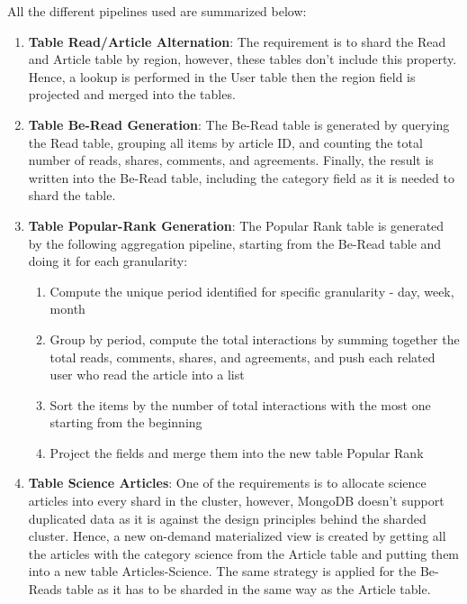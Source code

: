 \documentclass{report}
\begin{document}
    All the different pipelines used are summarized below:
    \begin{enumerate}
        \item \textbf{Table Read/Article Alternation}: The requirement is to shard the Read and Article table by region, however, these tables don't include this property. Hence, a lookup is performed in the User table then the region field is projected and merged into the tables.
        \item \textbf{Table Be-Read Generation}: The Be-Read table is generated by querying the Read table, grouping all items by article ID, and counting the total number of reads, shares, comments, and agreements. Finally, the result is written into the Be-Read table, including the category field as it is needed to shard the table.
        \item \textbf{Table Popular-Rank Generation}: The Popular Rank table is generated by the following aggregation pipeline, starting from the Be-Read table and doing it for each granularity:
         \begin{enumerate}
            \item Compute the unique period identified for specific granularity - day, week, month
            \item Group by period, compute the total interactions by summing together the total reads, comments, shares, and agreements, and push each related user who read the article into a list
            \item Sort the items by the number of total interactions with the most one starting from the beginning
            \item Project the fields and merge them into the new table Popular Rank
        \end{enumerate}
        \item \textbf{Table Science Articles}: One of the requirements is to allocate science articles into every shard in the cluster, however, MongoDB doesn't support duplicated data as it is against the design principles behind the sharded cluster. Hence, a new on-demand materialized view is created by getting all the articles with the category science from the Article table and putting them into a new table Articles-Science. The same strategy is applied for the Be-Reads table as it has to be sharded in the same way as the Article table.
    \end{enumerate}
\end{document}
